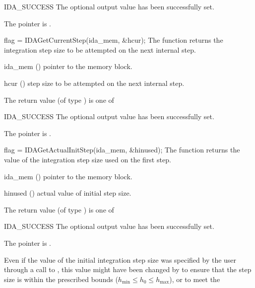 {{  \begin{args}
  \item[IDA\_SUCCESS] 
    The optional output value has been successfully set.
  \item[\Id{IDA\_MEM\_NULL}]
    The  pointer is .
  \end{args}
}
{}
{
  flag = IDAGetCurrentStep(ida\_mem, \&hcur);
}
{
  The function  returns the
  integration step size to be attempted on the next internal step.
}
{
  \begin{args}
  \item[ida\_mem] ()
    pointer to the {\ida} memory block.
  \item[hcur] ()
    step size to be attempted on the next internal step.
  \end{args}
}
{
  The return value  (of type ) is one of
  \begin{args}
  \item[IDA\_SUCCESS] 
    The optional output value has been successfully set.
  \item[\Id{IDA\_MEM\_NULL}]
    The  pointer is .
  \end{args}
}
{}
{
  flag = IDAGetActualInitStep(ida\_mem, \&hinused);
}
{
  The function  returns the
  value of the integration step size used on the first step.
}
{
  \begin{args}
  \item[ida\_mem] ()
    pointer to the {\ida} memory block.
  \item[hinused] ()
    actual value of initial step size.
  \end{args}
}
{
  The return value  (of type ) is one of
  \begin{args}
  \item[IDA\_SUCCESS] 
    The optional output value has been successfully set.
  \item[\Id{IDA\_MEM\_NULL}]
    The  pointer is .
  \end{args}
}
{
  Even if the value of the initial integration step size was specified
  by the user through a call to , this value might have 
  been changed by {\ida} to ensure that the step size is within the 
  prescribed bounds ($h_{\min} \le h_0 \le h_{\max}$), or to meet the
}}
